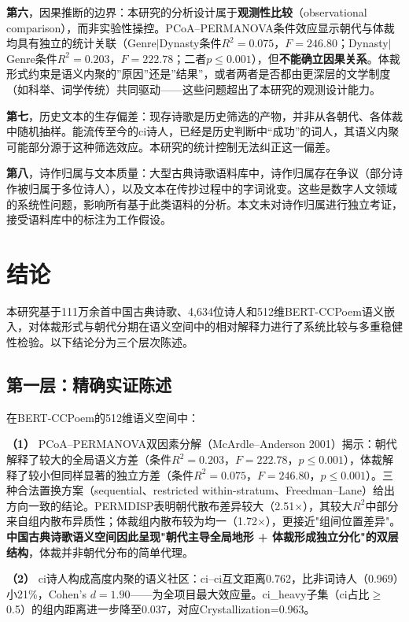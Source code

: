 \documentclass[12pt,a4paper]{article}
\numberwithin{equation}{section}
\begin{document}
\textbf{第六}，因果推断的边界：本研究的分析设计属于\textbf{观测性比较}（observational comparison），而非实验性操控。PCoA--PERMANOVA条件效应显示朝代与体裁均具有独立的统计关联（Genre$|$Dynasty条件$R^{2}=0.075$，$F=246.80$；Dynasty$|$Genre条件$R^{2}=0.203$，$F=222.78$；二者$p\leq0.001$），但\textbf{不能确立因果关系}。体裁形式约束是语义内聚的”原因”还是”结果”，或者两者是否都由更深层的文学制度（如科举、词学传统）共同驱动——这些问题超出了本研究的观测设计能力。

\textbf{第七}，历史文本的生存偏差：现存诗歌是历史筛选的产物，并非从各朝代、各体裁中随机抽样。能流传至今的ci诗人，已经是历史判断中“成功”的词人，其语义内聚可能部分源于这种筛选效应。本研究的统计控制无法纠正这一偏差。

\textbf{第八}，诗作归属与文本质量：大型古典诗歌语料库中，诗作归属存在争议（部分诗作被归属于多位诗人），以及文本在传抄过程中的字词讹变。这些是数字人文领域的系统性问题，影响所有基于此类语料的分析。本文未对诗作归属进行独立考证，接受语料库中的标注为工作假设。

\section{结论}

本研究基于111万余首中国古典诗歌、4,634位诗人和512维BERT-CCPoem语义嵌入，对体裁形式与朝代分期在语义空间中的相对解释力进行了系统比较与多重稳健性检验。以下结论分为三个层次陈述。

\subsection*{第一层：精确实证陈述}

在BERT-CCPoem的512维语义空间中：

\textbf{（1）} PCoA--PERMANOVA双因素分解（McArdle--Anderson 2001）揭示：朝代解释了较大的全局语义方差（条件$R^{2}=0.203$，$F=222.78$，$p\leq0.001$），体裁解释了较小但同样显著的独立方差（条件$R^{2}=0.075$，$F=246.80$，$p\leq0.001$）。三种合法置换方案（sequential、restricted within-stratum、Freedman--Lane）给出方向一致的结论。PERMDISP表明朝代散布差异较大（2.51$\times$），其较大$R^{2}$中部分来自组内散布异质性；体裁组内散布较为均一（1.72$\times$），更接近"组间位置差异"。\textbf{中国古典诗歌语义空间因此呈现"朝代主导全局地形 + 体裁形成独立分化"的双层结构}，体裁并非朝代分布的简单代理。

\textbf{（2）} ci诗人构成高度内聚的语义社区：ci--ci互文距离0.762，比非词诗人（0.969）小21\%，Cohen's $d=1.90$——为全项目最大效应量。ci\_heavy子集（ci占比$\ge$0.5）的组内距离进一步降至0.037，对应Crystallization=0.963。
\end{document}
